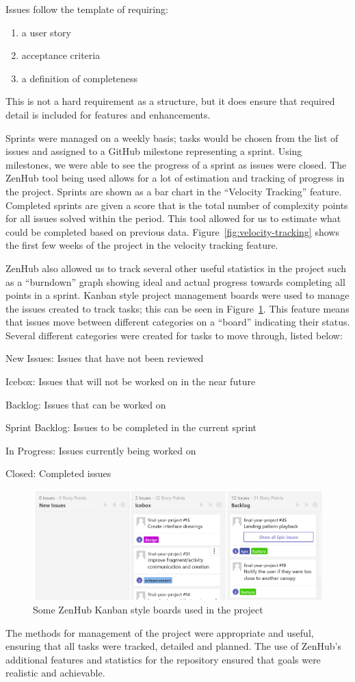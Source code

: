 Issues follow the template of requiring:
\begin{enumerate}[noitemsep]
  \item a user story
  \item acceptance criteria
  \item a definition of completeness
\end{enumerate}
This is not a hard requirement as a structure, but it does ensure that required detail is included for features and enhancements.

Sprints were managed on a weekly basis; tasks would be chosen from the list of issues and assigned to a GitHub milestone representing a sprint. Using milestones, we were able to see the progress of a sprint as issues were closed.
The ZenHub tool being used allows for a lot of estimation and tracking of progress in the project. Sprints are shown as a bar chart in the ``Velocity Tracking'' feature. Completed sprints are given a score that is the total number of complexity points for all issues solved within the period. This tool allowed for us to estimate what could be completed based on previous data. Figure~\ref{fig:velocity-tracking} shows the first few weeks of the project in the velocity tracking feature.

ZenHub also allowed us to track several other useful statistics in the project such as a ``burndown'' graph showing ideal and actual progress towards completing all points in a sprint.
Kanban style project management boards were used to manage the issues created to track tasks; this can be seen in Figure~\ref{fig:kanban-board}. This feature means that issues move between different categories on a ``board'' indicating their status. Several different categories were created for tasks to move through, listed below:
\newpage
\begin{description}[noitemsep]
  \item New Issues: Issues that have not been reviewed
  \item Icebox: Issues that will not be worked on in the near future
  \item Backlog: Issues that can be worked on
  \item Sprint Backlog: Issues to be completed in the current sprint
  \item In Progress: Issues currently being worked on
  \item Closed: Completed issues
\end{description}

\begin{figure}[ht]
  \centering
  \includegraphics[width=\linewidth]{img/issue-board.png}
  \caption{Some ZenHub Kanban style boards used in the project}\label{fig:kanban-board}
\end{figure}

The methods for management of the project were appropriate and useful, ensuring that all tasks were tracked, detailed and planned. The use of ZenHub's additional features and statistics for the repository ensured that goals were realistic and achievable.
